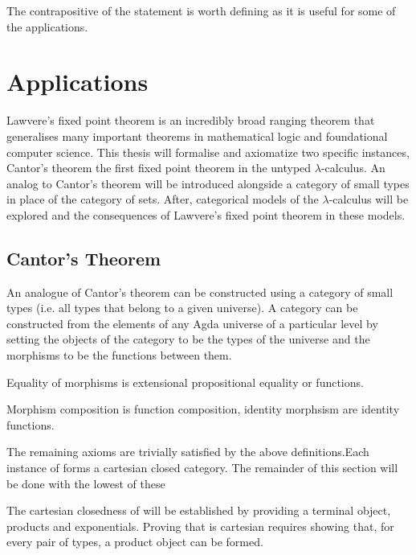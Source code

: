 The contrapositive of the statement is worth defining as it is useful for some
of the applications.

\section{Applications}

Lawvere's fixed point theorem is an incredibly broad ranging theorem that
generalises many important theorems in mathematical logic and foundational
computer science. This thesis will formalise and axiomatize two
specific instances, Cantor's theorem the first fixed point theorem
in the untyped $\lambda$-calculus. An analog to Cantor's theorem will be introduced
alongside a category of small types in place of the category of sets.
After, categorical models of the $\lambda$-calculus will be explored and the
consequences of Lawvere's fixed point theorem in these models.
\subsection{Cantor's Theorem}
\label{section:cantor}
An analogue of Cantor's theorem can be constructed using a category of small
types (i.e. all types that belong to a given universe). A category can be
constructed from the elements of any Agda universe of a particular level by
setting the objects of the category to be the types of the universe and the
morphisms to be the functions between them.

Equality of morphisms is extensional propositional equality or functions.

Morphism composition is function composition, identity morphsism are identity
functions.


The remaining axioms are trivially satisfied by the above definitions.Each
instance of  forms a cartesian closed category. The remainder
of this section will be done with the lowest of these


The cartesian closedness of  will be established by
providing a terminal object, products and exponentials.  Proving that
 is cartesian requires showing that, for every pair of
types, a product object can be formed.


